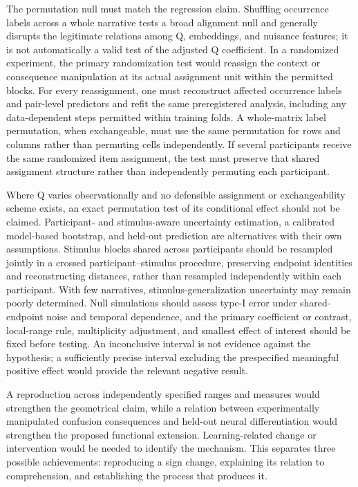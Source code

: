\documentclass[11pt]{article}
\begin{document}
The permutation null must match the regression claim. Shuffling
occurrence labels across a whole narrative tests a broad alignment null
and generally disrupts the legitimate relations among Q, embeddings, and
nuisance features; it is not automatically a valid test of the adjusted
Q coefficient. In a randomized experiment, the primary randomization
test would reassign the context or consequence manipulation at its
actual assignment unit within the permitted blocks. For every
reassignment, one must reconstruct affected occurrence labels and
pair-level predictors and refit the same preregistered analysis,
including any data-dependent steps permitted within training folds. A
whole-matrix label permutation, when exchangeable, must use the same
permutation for rows and columns rather than permuting cells
independently. If several participants receive the same randomized item
assignment, the test must preserve that shared assignment structure
rather than independently permuting each participant.

Where Q varies observationally and no defensible assignment or
exchangeability scheme exists, an exact permutation test of its
conditional effect should not be claimed. Participant- and
stimulus-aware uncertainty estimation, a calibrated model-based
bootstrap, and held-out prediction are alternatives with their own
assumptions. Stimulus blocks shared across participants should be
resampled jointly in a crossed participant--stimulus procedure,
preserving endpoint identities and reconstructing distances, rather than
resampled independently within each participant. With few narratives,
stimulus-generalization uncertainty may remain poorly determined. Null
simulations should assess type-I error under shared-endpoint noise and
temporal dependence, and the primary coefficient or contrast,
local-range rule, multiplicity adjustment, and smallest effect of
interest should be fixed before testing. An inconclusive interval is not
evidence against the hypothesis; a sufficiently precise interval
excluding the prespecified meaningful positive effect would provide the
relevant negative result.

A reproduction across independently specified ranges and measures would
strengthen the geometrical claim, while a relation between
experimentally manipulated confusion consequences and held-out neural
differentiation would strengthen the proposed functional extension.
Learning-related change or intervention would be needed to identify the
mechanism. This separates three possible achievements: reproducing a
sign change, explaining its relation to comprehension, and establishing
the process that produces it.
\end{document}

